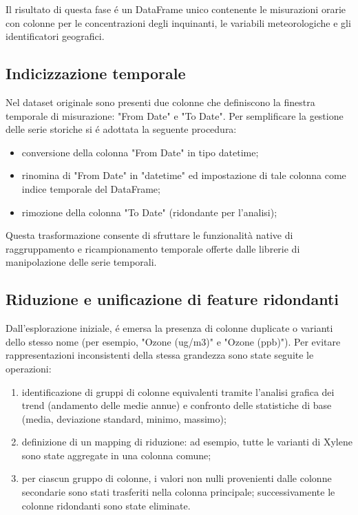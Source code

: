 \documentclass[a4paper,12pt]{report}
\begin{document}
	Il risultato di questa fase é un DataFrame unico contenente le misurazioni orarie con colonne per le concentrazioni degli inquinanti, le variabili meteorologiche e gli identificatori geografici.
	
	\subsection{Indicizzazione temporale}
	Nel dataset originale sono presenti due colonne che definiscono la finestra temporale di misurazione: "From Date" e "To Date". Per semplificare la gestione delle serie storiche si é adottata la seguente procedura:
	\begin{itemize}
		\item conversione della colonna "From Date" in tipo datetime;
		\item rinomina di "From Date" in "datetime" ed impostazione di tale colonna come indice temporale del DataFrame;
		\item rimozione della colonna "To Date" (ridondante per l'analisi);
	\end{itemize}
	Questa trasformazione consente di sfruttare le funzionalità native di raggruppamento e ricampionamento temporale offerte dalle librerie di manipolazione delle serie temporali.
	
	\subsection{Riduzione e unificazione di feature ridondanti}
	Dall'esplorazione iniziale, é emersa la presenza di colonne duplicate o varianti dello stesso nome (per esempio, "Ozone (ug/m3)" e "Ozone (ppb)"). Per evitare rappresentazioni inconsistenti della stessa grandezza sono state seguite le operazioni:
	\begin{enumerate}
		\item identificazione di gruppi di colonne equivalenti tramite l'analisi grafica dei trend (andamento delle medie annue) e confronto delle statistiche di base (media, deviazione standard, minimo, massimo);
		\item definizione di un mapping di riduzione: ad esempio, tutte le varianti di Xylene sono state aggregate in una colonna comune;
		\item per ciascun gruppo di colonne, i valori non nulli provenienti dalle colonne secondarie sono stati trasferiti nella colonna principale; successivamente le colonne ridondanti sono state eliminate.
	\end{enumerate}
	
\end{document}
